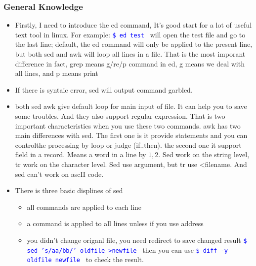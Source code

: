 \documentclass[a4paper,12pt,twoside]{book}
\newcommand{\linuxcommand}[1]{\texttt{\textcolor{blue}{\$ #1 \Pisymbol{psy}{191}}}}
\begin{document}
\begin{CJK*}{UTF8}{song}
	\subsubsection{General Knowledge}
		\begin{itemize}
		\item Firstly, I need to introduce the ed command, It's good start for a lot of useful text tool in linux.
		For example: \linuxcommand{ed test} will open the test file and go to the last line; default, the ed command will only
		be applied to the present line, but both sed and awk will loop all lines in a file. That is the most imporant difference
		in fact, grep means g/re/p command in ed, g means we deal with all lines, and p means print
		\item If there is syntaic error, sed will output command garbled.
		\item both sed awk give default loop for main input of file. It can help you to save some troubles. And they
		also support regular expression. That is two important characteristics when you use these two commands. awk has  two main
		differences with sed. The first one is it provide statements and you can controlthe processing by loop or judge (if..then).
		the second one it support field in a record. Means a word in a line by $1,$2. Sed work on the string level, tr work on the character level. Sed use argument, but tr use <filename.
		And sed can't work on ascII code.
		\item There is three basic displines of sed
			\begin{itemize}
			\item all commands are applied to each line
			\item a command is applied to all lines unless if you use address
			\item you didn't change origanl file, you need redirect to save changed result
			\linuxcommand{sed 's/aa/bb/' oldfile >newfile} then you can use \linuxcommand{diff -y oldfile newfile} to
			check the result.
			\end{itemize}
		\end{itemize}

\end{CJK*}
\end{document}
